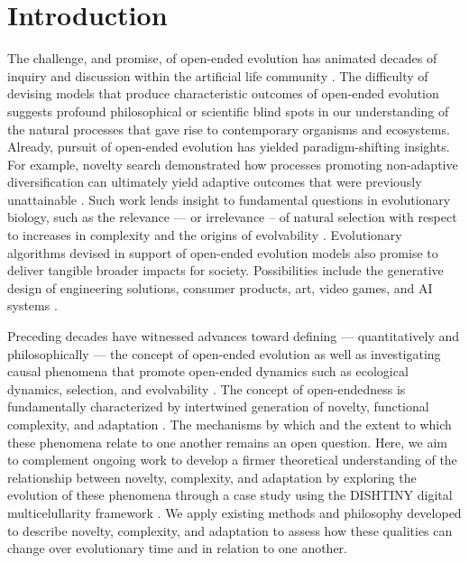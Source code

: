 \section{Introduction}

The challenge, and promise, of open-ended evolution has animated decades of inquiry and discussion within the artificial life community \citep{packard2019overview}.
The difficulty of devising models that produce characteristic outcomes of open-ended evolution suggests profound philosophical or scientific blind spots in our understanding of the natural processes that gave rise to contemporary organisms and ecosystems.
Already, pursuit of open-ended evolution has yielded paradigm-shifting insights.
For example, novelty search demonstrated how processes promoting non-adaptive diversification can ultimately yield adaptive outcomes that were previously unattainable \citep{lehman2011abandoning}. 
Such work lends insight to fundamental questions in evolutionary biology, such as the relevance — or irrelevance – of natural selection with respect to increases in complexity \citep{lehman2012evolution, Lynch8597} and the origins of evolvability \citep{lehman2013evolvability,Kirschner8420}. Evolutionary algorithms devised in support of open-ended evolution models also promise to deliver tangible broader impacts for society. Possibilities include the generative design of engineering solutions, consumer products, art, video games, and AI systems \citep{nguyen2015,stanley2017open}.

Preceding decades have witnessed advances toward defining — quantitatively and philosophically — the concept of open-ended evolution \citep{lehman2012beyond,dolson2019modes,bedau1998classification} as well as investigating causal phenomena that promote open-ended dynamics such as ecological dynamics, selection, and evolvability \citep{dolson2019constructive,soros2014identifying,huizinga2018emergence}.
The concept of open-endedness is fundamentally characterized by intertwined generation of novelty, functional complexity, and adaptation \citep{taylor2016open}.
The mechanisms by which and the extent to which these phenomena relate to one another remains an open question.
Here, we aim to complement ongoing work to develop a firmer theoretical understanding of the relationship between novelty, complexity, and adaptation by exploring the evolution of these phenomena through a case study using the DISHTINY digital multicelullarity framework \citep{moreno2019toward}.
We apply existing methods and philosophy developed to describe novelty, complexity, and adaptation to assess how these qualities can change over evolutionary time and in relation to one another.